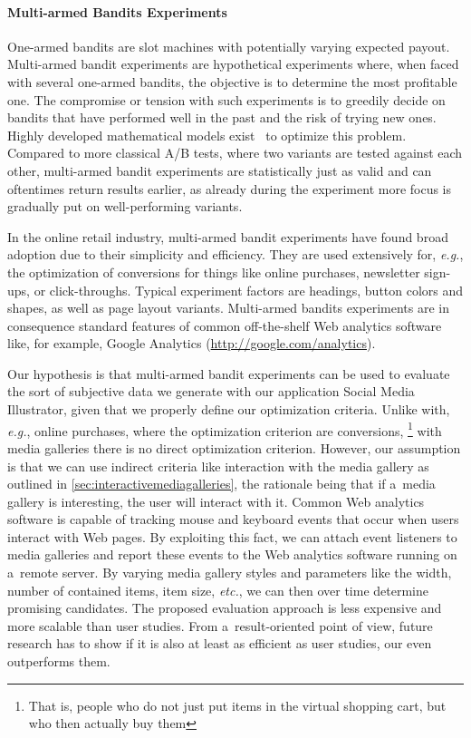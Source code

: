 \paragraph{Multi-armed Bandits Experiments}

One-armed bandits are slot machines
with potentially varying expected payout.
Multi-armed bandit experiments are hypothetical experiments
where, when faced with several one-armed bandits,
the objective is to determine the most profitable one.
The compromise or tension with such experiments is to
greedily decide on bandits that have performed well in the past
and the risk of trying new ones.
Highly developed mathematical models exist~\cite{scott2010bandits}
to optimize this problem.
Compared to more classical A/B tests, where two variants 
are tested against each other, multi-armed bandit experiments
are statistically just as valid and can oftentimes return results earlier, as already during the experiment
more focus is gradually put on well-performing variants.

In the online retail industry, multi-armed bandit experiments
have found broad adoption due to their simplicity and efficiency.
They are used extensively for, \emph{e.g.}, the optimization 
of conversions for things like
online purchases, newsletter sign-ups, or click-throughs.
Typical experiment factors are headings, button colors and shapes,
as well as page layout variants.
Multi-armed bandits experiments are in consequence standard features
of common off-the-shelf Web analytics software like, for example,
Google Analytics (\url{http://google.com/analytics}).

Our hypothesis is that multi-armed bandit experiments can be used 
to evaluate the sort of subjective data we generate
with our application Social Media Illustrator, given that we 
properly define our optimization criteria.
Unlike with, \emph{e.g.}, online purchases,
where the optimization criterion are conversions,%
\footnote{That is, people who do not just put items in the virtual shopping cart,
but who then actually buy them}
with media galleries there is no direct optimization criterion.
However, our assumption is that we can use indirect criteria like
interaction with the media gallery
as outlined in \autoref{sec:interactivemediagalleries},
the rationale being that if
a~media gallery is interesting, the user will interact with it.
Common Web analytics software is capable of tracking mouse and
keyboard events that occur when users interact with Web pages.
By exploiting this fact, we can attach event listeners
to media galleries and report these events
to the Web analytics software running on a~remote server.
By varying media gallery styles and parameters like the width,
number of contained items, item size, \emph{etc.},
we can then over time determine promising candidates.
The proposed evaluation approach is less expensive
and more scalable than user studies.
From a~result-oriented point of view,
future research has to show if it is also at least as efficient
as user studies, our even outperforms them.

